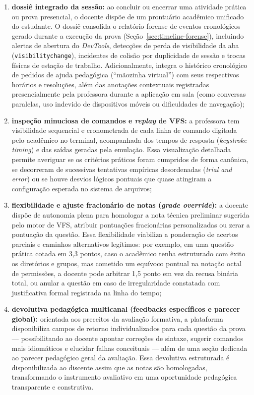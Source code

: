 \begin{enumerate}
    \item \textbf{dossiê integrado da sessão:} ao concluir ou encerrar uma atividade prática ou prova presencial, o docente dispõe de um prontuário acadêmico unificado do estudante. O dossiê consolida o relatório forense de eventos cronológicos gerado durante a execução da prova (Seção~\ref{sec:timeline-forense}), incluindo alertas de abertura do \textit{DevTools}, detecções de perda de visibilidade da aba (\texttt{visibilitychange}), incidentes de colisão por duplicidade de sessão e trocas físicas de estação de trabalho. Adicionalmente, integra o histórico cronológico de pedidos de ajuda pedagógica (``mãozinha virtual'') com seus respectivos horários e resoluções, além das anotações contextuais registradas presencialmente pela professora durante a aplicação em sala (como conversas paralelas, uso indevido de dispositivos móveis ou dificuldades de navegação);

    \item \textbf{inspeção minuciosa de comandos e \textit{replay} de VFS:} a professora tem visibilidade sequencial e cronometrada de cada linha de comando digitada pelo acadêmico no terminal, acompanhada dos tempos de resposta (\textit{keystroke timing}) e das saídas geradas pela emulação. Essa visualização detalhada permite averiguar se os critérios práticos foram cumpridos de forma canônica, se decorreram de sucessivas tentativas empíricas desordenadas (\textit{trial and error}) ou se houve desvios lógicos pontuais que quase atingiram a configuração esperada no sistema de arquivos;

    \item \textbf{flexibilidade e ajuste fracionário de notas (\textit{grade override}):} a docente dispõe de autonomia plena para homologar a nota técnica preliminar sugerida pelo motor de VFS, atribuir pontuações fracionárias personalizadas ou zerar a pontuação da questão. Essa flexibilidade viabiliza a ponderação de acertos parciais e caminhos alternativos legítimos: por exemplo, em uma questão prática cotada em 3,3 pontos, caso o acadêmico tenha estruturado com êxito os diretórios e grupos, mas cometido um equívoco pontual na notação octal de permissões, a docente pode arbitrar 1,5 ponto em vez da recusa binária total, ou anular a questão em caso de irregularidade constatada com justificativa formal registrada na linha do tempo;

    \item \textbf{devolutiva pedagógica multicanal (feedbacks específicos e parecer global):} orientada aos preceitos da avaliação formativa, a plataforma disponibiliza campos de retorno individualizados para cada questão da prova --- possibilitando ao docente apontar correções de sintaxe, sugerir comandos mais idiomáticos e elucidar falhas conceituais --- além de uma seção dedicada ao parecer pedagógico geral da avaliação. Essa devolutiva estruturada é disponibilizada ao discente assim que as notas são homologadas, transformando o instrumento avaliativo em uma oportunidade pedagógica transparente e construtiva.
\end{enumerate}
